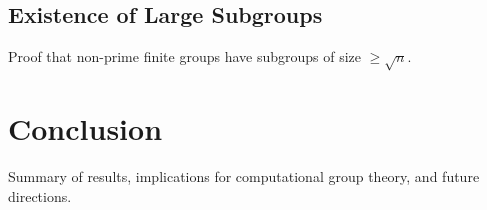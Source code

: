 \documentclass[sigconf]{acmart}
\begin{document}
\subsection{Existence of Large Subgroups}
Proof that non-prime finite groups have subgroups of size \( \geq \sqrt{n} \).

\section{Conclusion}
Summary of results, implications for computational group theory, and future directions.



\end{document}
